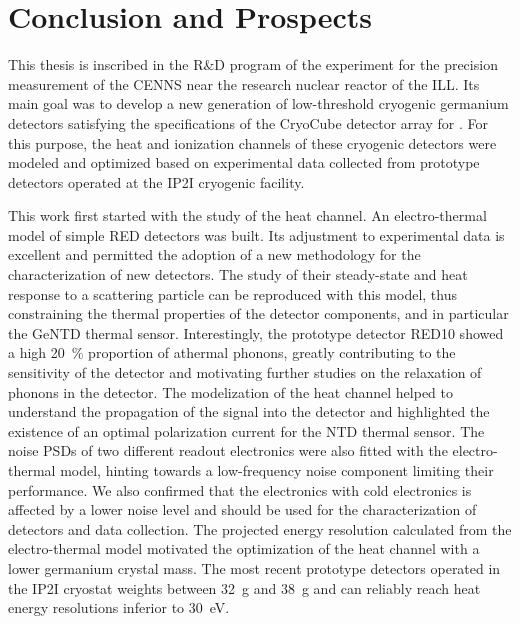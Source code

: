 

\chapter{Conclusion and Prospects} %
\label{ChapterConclusion} %


This thesis is inscribed in the R\&D program of the \Ricochet{} experiment for the precision measurement of the CENNS near the research nuclear reactor of the ILL. Its main goal was to develop a new generation of low-threshold cryogenic germanium detectors satisfying the specifications of the CryoCube detector array for \Ricochet{}. For this purpose, the heat and ionization channels of these cryogenic detectors were modeled and optimized based on experimental data collected from prototype detectors operated at the IP2I cryogenic facility.

This work first started with the study of the heat channel. An electro-thermal model of simple RED detectors was built. Its adjustment to experimental data is excellent and permitted the adoption of a new methodology for the characterization of new detectors. The study of their steady-state and heat response to a scattering particle can be reproduced with this model, thus constraining the thermal properties of the detector components, and in particular the GeNTD thermal sensor. Interestingly, the prototype detector RED10 showed a high \SI{20}{\percent} proportion of athermal phonons, greatly contributing to the sensitivity of the detector and motivating further studies on the relaxation of phonons in the detector. The modelization of the heat channel helped to understand the propagation of the signal into the detector and highlighted the existence of an optimal polarization current for the NTD thermal sensor.
The noise PSDs of two different readout electronics were also fitted with the electro-thermal model, hinting towards a low-frequency noise component limiting their performance. We also confirmed that the \Edelweiss{} electronics with cold electronics is affected by a lower noise level and should be used for the characterization of detectors and data collection.
The projected energy resolution calculated from the electro-thermal model motivated the optimization of the heat channel with a lower germanium crystal mass. The most recent prototype detectors operated in the IP2I cryostat weights between \SI{32}{\g} and \SI{38}{\g} and can reliably reach heat energy resolutions inferior to \SI{30}{\eV}.

